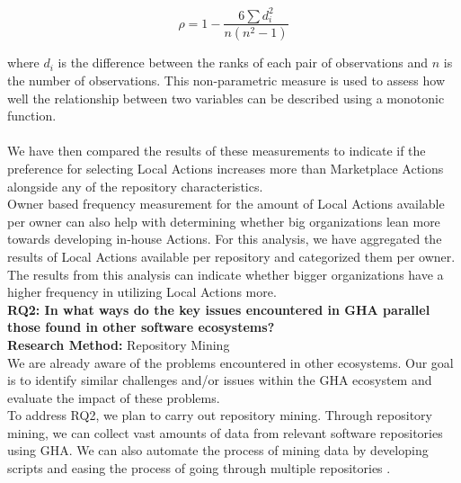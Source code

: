 \documentclass[conference]{IEEEtran}
\begin{document}
            \begin{equation}
            \rho = 1 - \frac{6 \sum d_i^2}{n(n^2 - 1)}
            \end{equation}
            
            where \(d_i\) is the difference between the ranks of each pair of observations and \(n\) is the number of observations. This non-parametric measure is used to assess how well the relationship between two variables can be described using a monotonic function. \\             
            \\ We have then compared the results of these measurements to indicate if the preference for selecting Local Actions increases more than Marketplace Actions alongside any of the repository characteristics. \\
            Owner based frequency measurement for the amount of Local Actions available per owner can also help with determining whether big organizations lean more towards developing in-house Actions. For this analysis, we have aggregated the results of Local Actions available per repository and categorized them per owner. The results from this analysis can indicate whether bigger organizations have a higher frequency in utilizing Local Actions more. \\

        \textbf{RQ2: In what ways do the key issues encountered in GHA parallel those found in other software ecosystems?}\\

            \textbf{Research Method:} Repository Mining\\
            We are already aware of the problems encountered in other ecosystems. Our goal is to identify similar challenges and/or issues within the GHA ecosystem and evaluate the impact of these problems.\\
            To address RQ2, we plan to carry out repository mining. Through repository mining, we can collect vast amounts of data from relevant software repositories using GHA. We can also automate the process of mining data by developing scripts\cite{Marof2024}  and easing the process of going through multiple repositories \cite{chaturvedi2013tools}.\\
\end{document}

